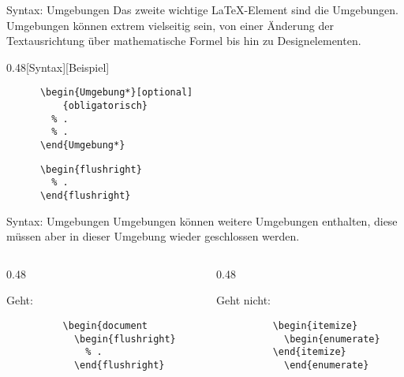 \begin{frame}[fragile]{Syntax: Umgebungen}
  Das zweite wichtige \LaTeX-Element sind die Umgebungen.
  Umgebungen können extrem vielseitig sein, von einer Änderung der Textausrichtung über mathematische Formel bis hin zu Designelementen.
  \begin{CodeExample}{0.48}[Syntax][Beispiel]
    \begin{lstlisting}
      \begin{Umgebung*}[optional]
          {obligatorisch}
        % .
        % .
      \end{Umgebung*}
    \end{lstlisting}
  \CodeResult
    \begin{lstlisting}
      \begin{flushright}
        % .
      \end{flushright}
    \end{lstlisting}
  \end{CodeExample}
\end{frame}

\begin{frame}[fragile]{Syntax: Umgebungen}
  Umgebungen können weitere Umgebungen enthalten, diese müssen aber in dieser Umgebung wieder geschlossen werden.
  \begin{columns}[onlytextwidth, t]
    \begin{column}{0.48\textwidth}
      \begin{block}{Geht:}
        \begin{lstlisting}
          \begin{document
            \begin{flushright}
              % .
            \end{flushright}
          
        \end{lstlisting}
      \end{block}
    \end{column}
    \begin{column}{0.48\textwidth}
      \begin{alertblock}{Geht nicht:}
        \begin{lstlisting}
          \begin{itemize}
            \begin{enumerate}
          \end{itemize}
            \end{enumerate}
        \end{lstlisting}
      \end{alertblock}
    \end{column}
  \end{columns}
\end{frame}

